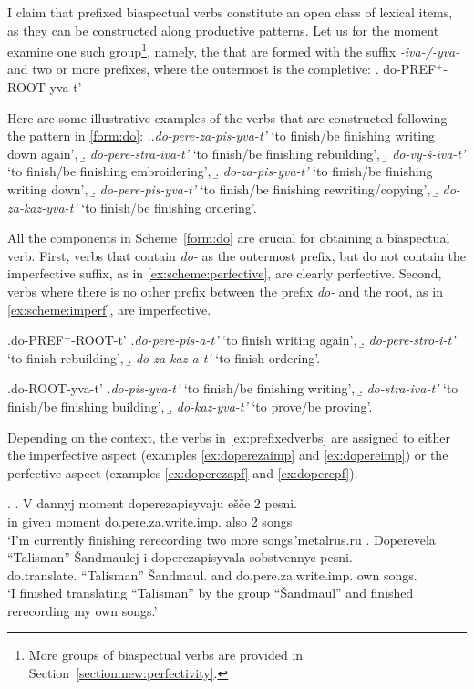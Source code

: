 I claim that prefixed biaspectual verbs constitute an open class of lexical items, as they can be constructed along productive patterns. Let us for the moment examine one such group\footnote{More groups of biaspectual verbs are provided in Section~\ref{section:new:perfectivity}.}, namely, the  that are formed with the suffix \textit{-iva-/-yva-} and two or more prefixes, where the outermost is the completive:
\ex. \label{form:do}do-PREF$^{+}$-ROOT-yva-t'

Here are some illustrative examples of the verbs that are constructed following the pattern in \ref{form:do}: 
\ex.\label{ex:prefixedverbs}\a.\textit{do-pere-za-pis-yva-t'} `to finish/be finishing writing down again', 
\b. \textit{do-pere-stra-iva-t'} `to finish/be finishing rebuilding',
\b. \textit{do-vy-\v{s}-iva-t'} `to finish/be finishing embroidering',
\b. \textit{do-za-pis-yva-t'} `to finish/be finishing writing down', 
\b. \textit{do-pere-pis-yva-t'} `to finish/be finishing rewriting/copying', 
\b. \textit{do-za-kaz-yva-t'} `to finish/be finishing ordering'.

All the components in Scheme~\ref{form:do} are crucial for obtaining a biaspectual verb. First, verbs that contain \textit{do-} as the outermost prefix, but do not contain the imperfective suffix, as in \ref{ex:scheme:perfective}, are clearly perfective. Second, verbs where there is no other prefix between the prefix \textit{do-} and the root, as in \ref{ex:scheme:imperf}, are imperfective.

\ex.\label{ex:scheme:perfective}do-PREF$^{+}$-ROOT-t'
\a.\textit{do-pere-pis-a-t'}\textsuperscript{\PF} `to finish writing again', 
\b. \textit{do-pere-stro-i-t'}\textsuperscript{\PF} `to finish rebuilding',
\b. \textit{do-za-kaz-a-t'}\textsuperscript{\PF} `to finish ordering'.

\ex.\label{ex:scheme:imperf}do-ROOT-yva-t'
\a.\textit{do-pis-yva-t'}\textsuperscript{\IPF} `to finish/be finishing writing', 
\b. \textit{do-stra-iva-t'}\textsuperscript{\IPF} `to finish/be finishing building',
\b. \textit{do-kaz-yva-t'}\textsuperscript{\IPF} `to prove/be proving'.

Depending on the context, the verbs in \ref{ex:prefixedverbs} are assigned to either the imperfective aspect (examples \ref{ex:doperezaimp} and \ref{ex:dopereimp}) or the perfective aspect (examples \ref{ex:doperezapf} and \ref{ex:doperepf}). 

\ex. \ag. \label{ex:doperezaimp}V dannyj moment doperezapisyvaju e\v{s}\v{c}e 2 pesni.\\
in given moment do.pere.za.write.imp. also 2 songs\\
\trans `I'm currently finishing rerecording two more songs.'\hfill metalrus.ru
\bg. \label{ex:doperezapf}Doperevela ``Talisman'' \v{S}andmaulej i doperezapisyvala sobstvennye pesni.\\
do.translate. ``Talisman'' \v{S}andmaul. and do.pere.za.write.imp. own songs.\\
\trans `I finished translating ``Talisman'' by the group ``\v{S}andmaul'' and finished rerecording my own songs.'

